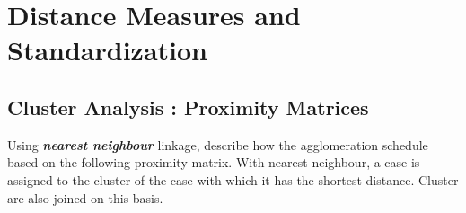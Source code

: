 \documentclass[a4paper,12pt]{report}
\begin{document}
	
	
	
	
	\tableofcontents
	\newpage
	
	\Large

 \chapter{Distance Measures and Standardization}
%
%
\section{Cluster Analysis : Proximity Matrices}

Using \textbf{\textit{nearest neighbour}} linkage, describe how the agglomeration schedule based on the following 
proximity matrix. With nearest neighbour, a case is assigned to the cluster of the case with which it has the shortest distance. Cluster are also joined on this basis.
\end{document}
